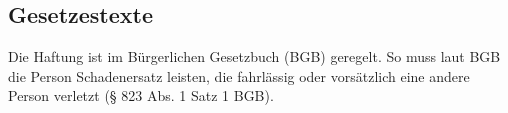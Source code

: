 \documentclass[12pt,a4paper]{article}
\begin{document}
\subsection{Gesetzestexte}

Die Haftung ist im Bürgerlichen Gesetzbuch (BGB) geregelt. So muss laut BGB die Person Schadenersatz leisten, die fahrlässig oder vorsätzlich eine andere Person verletzt (§ 823 Abs. 1 Satz 1 BGB).

\newpage
\begingroup
{} %
\setlength{\bibitemsep}{0.5\baselineskip} %
\printbibliography[title=Literaturverzeichnis]
\endgroup
\end{document}
